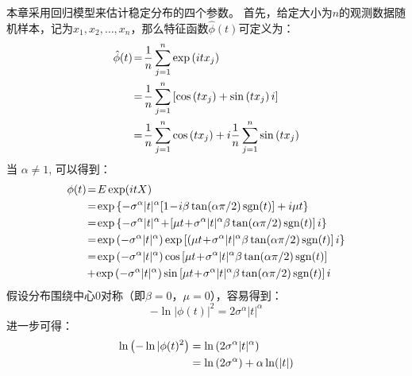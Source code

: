 本章采用回归模型来估计稳定分布的四个参数。
首先，给定大小为$n$的观测数据随机样本，记为$x_1, x_2, \ldots, x_n$，那么特征函数$\hat{\phi}(t)$可定义为：
\begin{align}
	\hat{\phi}(t)&\!=\!\frac{1}{n} \sum_{j=1}^{n} \exp \left(i t x_{j}\right) \notag \\
	&\!=\!\frac{1}{n} \sum_{j=1}^{n}\left[\cos \left(t x_{j}\right)+\sin \left(t x_{j}\right) i\right] \notag \\
	&\!=\!\frac{1}{n} \sum_{j=1}^{n} \cos \left(t x_{j}\right)+i \frac{1}{n} \sum_{j=1}^{n} \sin \left(t x_{j}\right)
\end{align}
当 $\alpha \neq 1$, 可以得到：
\begin{align}
	\phi(t) 
	&\!=\!E \exp (i t X) \notag \\ 
	&\!=\!\exp \left\{-\sigma^{\alpha}|t|^{\alpha}[1\!-\!i \beta \tan (\alpha \pi / 2) \operatorname{sgn}(t)]+i \mu t\right\} \notag \\ 
	&\!=\!\exp \left\{-\sigma^{\alpha}|t|^{\alpha}\!+\!\left[\mu t\!+\!\sigma^{\alpha}|t|^{\alpha} \beta \tan (\alpha \pi / 2) \operatorname{sgn}(t)\right] i\right\} \notag \\  
	&\!=\!\exp \left(-\sigma^{\alpha}|t|^{\alpha}\right) \exp \left[\left(\mu t\!+\!\sigma^{\alpha}|t|^{\alpha} \beta \tan (\alpha \pi / 2) \operatorname{sgn}(t)\right] i\right\} \notag \\ 
	&\!=\!\exp \left(-\sigma^{\alpha}|t|^{\alpha}\right) \cos \left[\mu t\!+\!\sigma^{\alpha}|t|^{\alpha} \beta \tan (\alpha \pi / 2) \operatorname{sgn}(t)\right] \notag \\ 
	&\!+\!\exp \left(-\sigma^{\alpha}|t|^{\alpha}\right) \sin \left[\mu t\!+\!\sigma^{\alpha}|t|^{\alpha} \beta \tan (\alpha \pi / 2) \operatorname{sgn}(t)\right] i 
\label{equ 5-5}
\end{align}
假设分布围绕中心$0$对称（即$\beta = 0$，$\mu = 0$），容易得到：
\begin{equation}
	-\ln |\phi(t)|^{2}=2 \sigma^{\alpha}|t|^{\alpha}
\end{equation}
进一步可得：
\begin{align} 
	\ln \left(-\ln | \phi(t)^{2}\right)
	&= \ln \left(2 \sigma^{\alpha}|t|^{\alpha}\right) \notag \\ 
	&=\ln \left(2 \sigma^{\alpha}\right)+\alpha \ln (|t|) 
\end{align}


